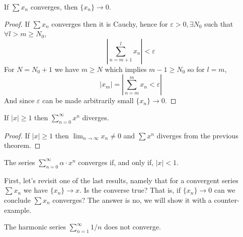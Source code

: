 \begin{theorem}
    If $\sum x_n$ converges, then $\{x_n\} \to 0$.
\end{theorem}

\begin{proof}
    If $\sum x_n$ converges then it is Cauchy, hence for $\varepsilon > 0, \exists N_0$ such that $\forall l > m \geq N_0$, 
    \begin{equation*}
        \left |
            \sum \limits_{n=m+1}^l x_n
        \right | < \varepsilon
    \end{equation*}
    For $N  = N_0 + 1$ we have $m \geq N$ which implies $m-1 \geq N_0$ so for $l=m$,
    \begin{equation*}
        |x_m| = \left |
            \sum \limits_{n=m}^m x_n < \varepsilon
        \right |
    \end{equation*}
    And since $\varepsilon$ can be made arbitrarily small $\{x_n\} \to 0$.
\end{proof}

\begin{theorem}
    If $|x| \geq 1$ then $\sum_{n=0}^\infty x^n$ diverges.
\end{theorem}

\begin{proof}
    If $|x| \geq 1$ then $\lim_{n \to \infty} x_n \neq 0$ and $\sum x^n$ diverges from the previous theorem.
\end{proof}

\begin{corollary}
    The series $\sum _{n=0}^\infty \alpha \cdot x^n$ converges if, and only if, $|x| < 1$.
\end{corollary}

First, let's revisit one of the last results, namely that for a convergent series $\sum x_n$ we have $\{x_n\} \to x$. Is the converse true? That is, if $\{x_n\} \to 0$ can we conclude $\sum x_n$ converges? The answer is no, we will show it with a counter-example.

\begin{theorem}
    The harmonic series $\sum_{n=1}^\infty 1/n$ does not converge.
\end{theorem}


